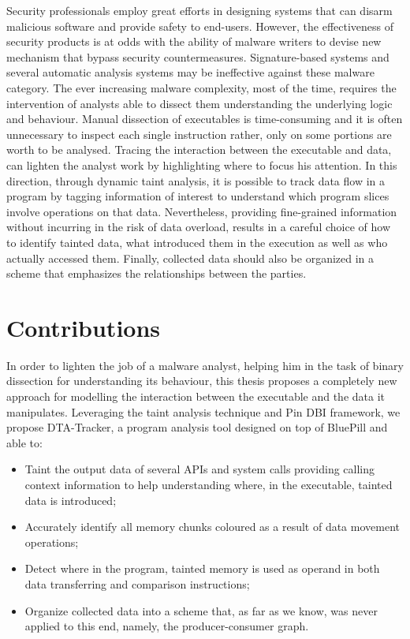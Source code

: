 \documentclass[LaM,binding=0.6cm]{sapthesis}
\begin{document}
Security professionals employ great efforts in designing systems that can disarm malicious software and provide safety to end-users. However, the effectiveness of security products is at odds with the ability of malware writers to devise new mechanism that bypass security countermeasures. Signature-based systems and several automatic analysis systems may be ineffective against these malware category. The ever increasing malware complexity, most of the time, requires the intervention of analysts able to dissect them understanding the underlying logic and behaviour. Manual dissection of executables is time-consuming and it is often unnecessary to inspect each single instruction rather, only on some portions are worth to be analysed. Tracing the interaction between the executable and data, can lighten the analyst work by highlighting where to focus his attention. In this direction, through dynamic taint analysis, it is possible to track data flow in a program by tagging information of interest to understand which program slices involve operations on that data. Nevertheless, providing fine-grained information without incurring in the risk of data overload, results in a careful choice of how to identify tainted data, what introduced them in the execution as well as who actually accessed them. Finally, collected data should also be organized in a scheme that emphasizes the relationships between the parties.

\section{Contributions}
In order to lighten the job of a malware analyst, helping him in the task of binary dissection for understanding its behaviour, this thesis proposes a completely new approach for modelling the interaction between the executable and the data it manipulates. Leveraging the taint analysis technique and Pin DBI framework, we propose DTA-Tracker, a program analysis tool designed on top of BluePill and able to:
\begin{itemize}
\item Taint the output data of several APIs and system calls providing calling context information to help understanding where, in the executable, tainted data is introduced;
\item Accurately identify all memory chunks coloured as a result of data movement operations;
\item Detect where in the program, tainted memory is used as operand in both data transferring and comparison instructions;
\item Organize collected data into a scheme that, as far as we know, was never applied to this end, namely, the producer-consumer graph.
\end{itemize}  
\end{document}
